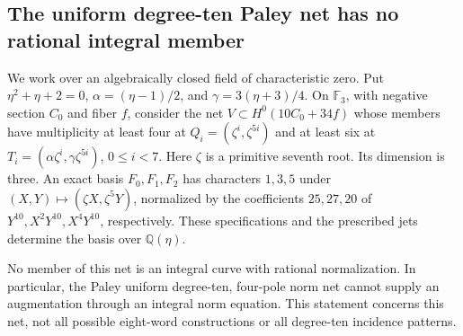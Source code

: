 \subsection{The uniform degree-ten Paley net has no rational integral member}
\label{app:paley-net-rational-exclusion}

We work over an algebraically closed field of characteristic zero. Put
$\eta^2+\eta+2=0$, $\alpha=(\eta-1)/2$, and $\gamma=3(\eta+3)/4$.
On $\mathbb F_3$, with negative section $C_0$ and fiber $f$, consider the
net $V\subset H^0(10C_0+34f)$ whose members have multiplicity at least
four at $Q_i=(\zeta^i,\zeta^{5i})$ and at least six at
$T_i=(\alpha\zeta^i,\gamma\zeta^{5i})$, $0\le i<7$. Here $\zeta$ is a primitive
seventh root. Its dimension is three. An exact basis $F_0,F_1,F_2$ has
characters $1,3,5$ under $(X,Y)\mapsto(\zeta X,\zeta^5Y)$, normalized
by the coefficients $25,27,20$ of $Y^{10},X^2Y^{10},X^4Y^{10}$,
respectively. These specifications and the prescribed jets determine the
basis over $\mathbb Q(\eta)$.

\begin{theorem}
\label{thm:paley-net-no-rational}
No member of this net is an integral curve with rational normalization.
In particular, the Paley uniform degree-ten, four-pole norm net cannot
supply an augmentation through an integral norm equation. This statement concerns this net, not all
possible eight-word constructions or all degree-ten incidence patterns.
\end{theorem}

